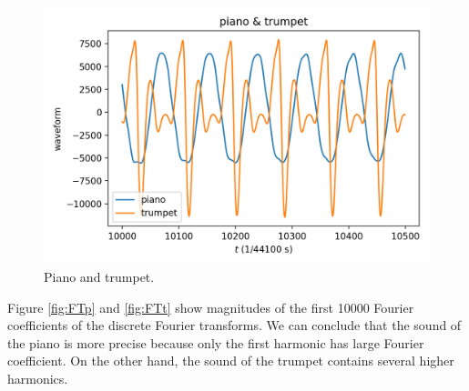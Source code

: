 \documentclass[11pt]{article}
\begin{document}
\begin{figure}[H]
    \centering
    \includegraphics[scale = 0.8]{images/ps-8-2pt.png}
    \caption{Piano and trumpet.}
    \label{fig:pt}
\end{figure}

Figure \ref{fig:FTp} and \ref{fig:FTt} show magnitudes of the first 10000 Fourier coefficients of the discrete Fourier transforms. We can conclude that the sound of the piano is more precise because only the first harmonic has large Fourier coefficient. On the other hand, the sound of the trumpet contains several higher harmonics.
\end{document}
